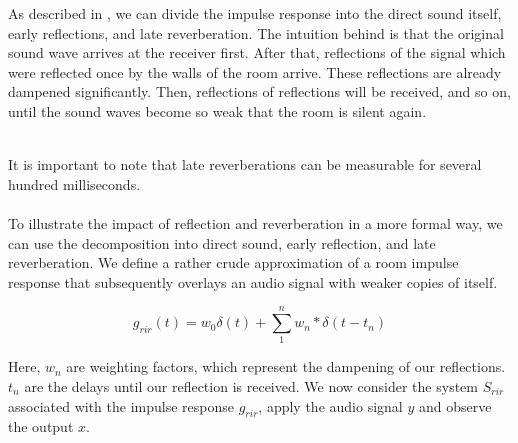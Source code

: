 As described in \cite{yoshioka2012making}, we can divide the impulse response into the direct sound itself, early reflections, and late reverberation. The intuition behind is that the original sound wave arrives at the receiver first. After that, reflections of the signal which were reflected once by the walls of the room arrive. These reflections are already dampened significantly. Then, reflections of reflections will be received, and so on, until the sound waves become so weak that the room is silent again. 
\\ \\
\begin{minipage}{\linewidth}
	\label{fig:air_rir}
\end{minipage}

It is important to note that late reverberations can be measurable for several hundred milliseconds.\\\\

To illustrate the impact of reflection and reverberation in a more formal way, we can use the decomposition into direct sound, early reflection, and late reverberation. We define a rather crude approximation of a room impulse response that subsequently overlays an audio signal with weaker copies of itself.

\[
g_{rir}(t) = w_0 \delta(t) + \sum_{1}^{n} w_n * \delta(t - t_n)
\]

Here, $w_n$ are weighting factors, which represent the dampening of our reflections. $t_n$ are the delays until our reflection is received. We now consider the system $S_{rir}$ associated with the impulse response $g_{rir}$, apply the audio signal $y$ and observe the output $x$.

